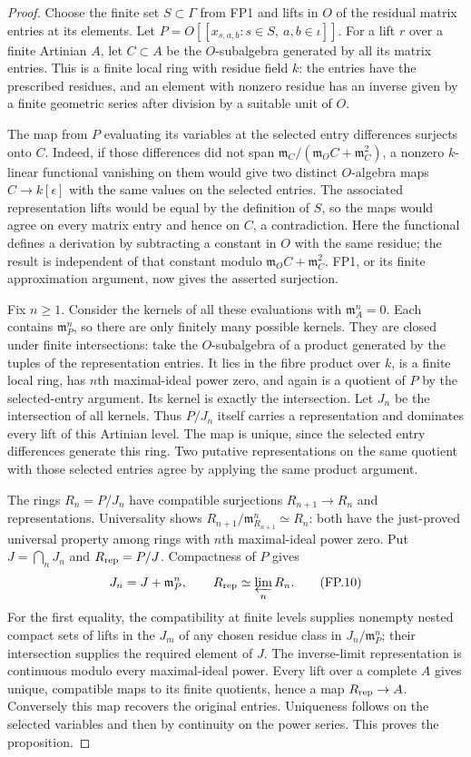 \begin{proof}
Choose the finite set $S\subset\Gamma$ from FP1 and lifts in $O$ of
the residual matrix entries at its elements.  Let
$P=O[[x_{s,a,b}:s\in S,\ a,b\in\iota]]$.
For a lift $r$ over a finite Artinian $A$, let $C\subset A$ be the
$O$-subalgebra generated by all its matrix entries.
This is a finite local ring with residue field $k$: the entries
have the prescribed residues, and an element with nonzero residue
has an inverse given by a finite geometric series after division
by a suitable unit of $O$.

The map from $P$ evaluating its variables at the selected entry
differences surjects onto $C$.
Indeed, if those differences did not span
$\mathfrak m_C/(\mathfrak m_OC+\mathfrak m_C^2)$, a nonzero
$k$-linear functional vanishing on them would give two distinct
$O$-algebra maps $C\to k[\epsilon]$ with the same values on the
selected entries.  The associated representation lifts would be
equal by the definition of $S$, so the maps would agree on every
matrix entry and hence on $C$, a contradiction.
Here the functional defines a derivation by subtracting a constant
in $O$ with the same residue; the result is independent of that
constant modulo $\mathfrak m_OC+\mathfrak m_C^2$.
FP1, or its finite approximation argument, now gives the asserted
surjection.

Fix $n\ge1$.  Consider the kernels of all these evaluations with
$\mathfrak m_A^n=0$.  Each contains $\mathfrak m_P^n$, so there are
only finitely many possible kernels.
They are closed under finite intersections: take the $O$-subalgebra
of a product generated by the tuples of the representation entries.
It lies in the fibre product over $k$, is a finite local ring, has
$n$th maximal-ideal power zero, and again is a quotient of $P$ by
the selected-entry argument.  Its kernel is exactly the
intersection.  Let $J_n$ be the intersection of all kernels.
Thus $P/J_n$ itself carries a representation and dominates every
lift of this Artinian level.  The map is unique, since the selected
entry differences generate this ring.
Two putative representations on the same quotient with those
selected entries agree by applying the same product argument.

The rings $R_n=P/J_n$ have compatible surjections
$R_{n+1}\to R_n$ and representations.
Universality shows
$R_{n+1}/\mathfrak m_{R_{n+1}}^n\simeq R_n$:
both have the just-proved universal property among rings with
$n$th maximal-ideal power zero.
Put $J=\bigcap_nJ_n$ and $R_{\rm rep}=P/J$.
Compactness of $P$ gives
\[
          J_n=J+\mathfrak m_P^n,\qquad
          R_{\rm rep}\simeq\varprojlim_nR_n .
 \tag{FP.10}
\]
For the first equality, the compatibility at finite levels supplies
nonempty nested compact sets of lifts in the $J_m$ of any chosen
residue class in $J_n/\mathfrak m_P^n$; their intersection supplies
the required element of $J$.
The inverse-limit representation is continuous modulo every
maximal-ideal power.  Every lift over a complete $A$ gives unique,
compatible maps to its finite quotients, hence a map
$R_{\rm rep}\to A$.  Conversely this map recovers the original
entries.  Uniqueness follows on the selected variables and then
by continuity on the power series.  This proves the proposition.
\end{proof}
